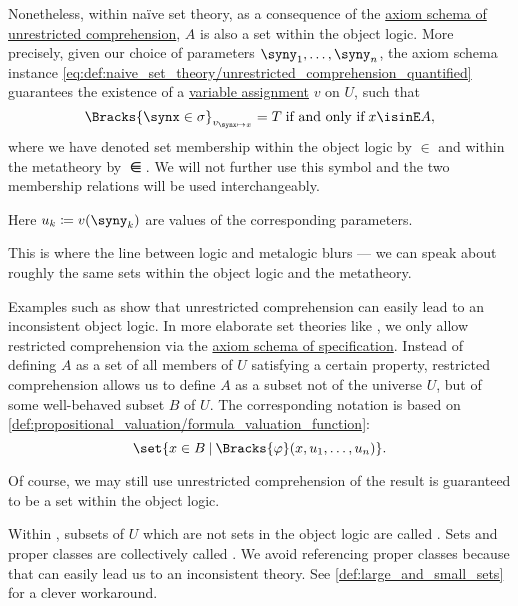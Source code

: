 \begin{definition}
  Nonetheless, within na\"ive set theory, as a consequence of the \hyperref[def:naive_set_theory/unrestricted_comprehension]{axiom schema of unrestricted comprehension}, \( A \) is also a set within the object logic. More precisely, given our choice of parameters \( \syny_1, \ldots, \syny_n \), the axiom schema instance \eqref{eq:def:naive_set_theory/unrestricted_comprehension_quantified} guarantees the existence of a \hyperref[def:first_order_valuation/variable_assignment]{variable assignment} \( v \) on \( U \), such that
  \begin{equation*}
    \Bracks{ \synx \in \sigma }_{ v_{\synx \mapsto x} } = T
    \T{if and only if}
    x \isinE A,
  \end{equation*}
  where we have denoted set membership within the object logic by \( \in \) and within the metatheory by \( \isinE \). We will not further use this symbol and the two membership relations will be used interchangeably.

  Here \( u_k \coloneqq v(\syny_k) \) are values of the corresponding parameters.

  This is where the line between logic and metalogic blurs --- we can speak about roughly the same sets within the object logic and the metatheory.

  Examples such as  show that unrestricted comprehension can easily lead to an inconsistent object logic. In more elaborate set theories like \hyperref[def:zfc]{}, we only allow restricted comprehension via the \hyperref[def:zfc/specification]{axiom schema of specification}. Instead of defining \( A \) as a set of all members of \( U \) satisfying a certain property, restricted comprehension allows us to define \( A \) as a subset not of the universe \( U \), but of some well-behaved subset \( B \) of \( U \). The corresponding notation is based on \cref{def:propositional_valuation/formula_valuation_function}:
  \begin{equation*}
    \set{ x \in B \given \Bracks{\varphi}(x, u_1, \ldots, u_n) }.
  \end{equation*}

  Of course, we may still use unrestricted comprehension of the result is guaranteed to be a set within the object logic.

  Within , subsets of \( U \) which are not sets in the object logic are called . Sets and proper classes are collectively called . We avoid referencing proper classes because that can easily lead us to an inconsistent theory. See \cref{def:large_and_small_sets} for a clever workaround.


\end{definition}
